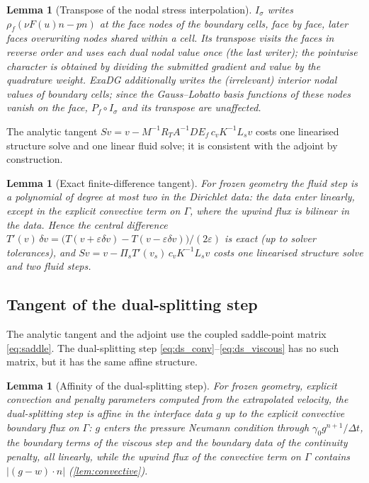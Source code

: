 \documentclass[11pt,a4paper]{article}
\newtheorem{lemma}[proposition]{Lemma}
\theoremstyle{definition}
\theoremstyle{remark}
\newcommand{\G}{\Gamma}
\newcommand{\M}{M}
\newcommand{\Pis}{\Pi_{s}}
\begin{document}
\begin{lemma}[Transpose of the nodal stress interpolation]\label{lem:stress}
$I_\sigma$ writes $\rho_f(\nu F(u)n-pn)$ at the face nodes of the boundary cells, face by face,
later faces overwriting nodes shared within a cell. Its transpose visits the faces in reverse order
and uses each dual nodal value once (the last writer); the pointwise character is obtained by
dividing the submitted gradient and value by the quadrature weight. ExaDG additionally writes the
(irrelevant) interior nodal values of boundary cells; since the Gauss--Lobatto basis functions of
these nodes vanish on the face, $P_f\circ I_\sigma$ and its transpose are unaffected.
\end{lemma}

The analytic tangent $S v = v - \M^{-1}R_TA^{-1}DE_f\,c_vK^{-1}L_s v$ costs one linearised
structure solve and one linear fluid solve; it is consistent with the adjoint by construction.


\begin{lemma}[Exact finite-difference tangent]\label{lem:fd}
For frozen geometry the fluid step is a polynomial of degree at most two in the Dirichlet data: the
data enter linearly, except in the explicit convective term on $\G$, where the upwind flux is
bilinear in the data. Hence the central difference
$T'(v)\,\delta v = \big(T(v+\varepsilon\delta v)-T(v-\varepsilon\delta v)\big)/(2\varepsilon)$ is
exact (up to solver tolerances), and
$S v = v - \Pis T'(v_s)\,c_vK^{-1}L_s v$ costs one linearised structure solve and two fluid steps.
\end{lemma}

\subsection{Tangent of the dual-splitting step}\label{sec:ds_tangent}

The analytic tangent and the adjoint use the coupled saddle-point matrix \eqref{eq:saddle}. The
dual-splitting step \eqref{eq:ds_conv}--\eqref{eq:ds_viscous} has no such matrix, but it has the
same affine structure.

\begin{lemma}[Affinity of the dual-splitting step]\label{lem:ds_affine}
For frozen geometry, explicit convection and penalty parameters computed from the extrapolated
velocity, the dual-splitting step is affine in the interface data $g$ up to the explicit convective
boundary flux on $\G$: $g$ enters the pressure Neumann condition through
$\gamma_0g^{n+1}/\Delta t$, the boundary terms of the viscous step and the boundary data of the
continuity penalty, all linearly, while the upwind flux of the convective term on $\G$ contains
$|(g-w)\cdot n|$ (\cref{lem:convective}).
\end{lemma}
\end{document}
